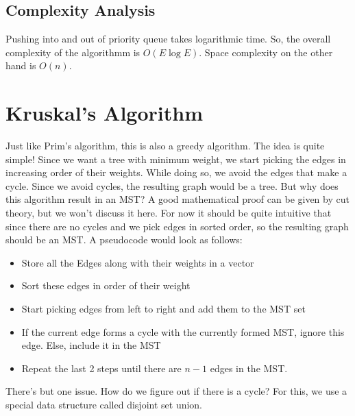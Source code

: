 \subsection{Complexity Analysis}
Pushing into and out of priority queue takes logarithmic time. So, the overall complexity of the algorithmm is $O(E \log E)$. Space complexity on the other hand is $O(n)$. 

\section{Kruskal's Algorithm}
Just like Prim's algorithm, this is also a greedy algorithm. The idea is quite simple! Since we want a tree with minimum weight, we start picking the edges in increasing order of their weights. While doing so, we avoid the edges that make a cycle. Since we avoid cycles, the resulting graph would be a tree. But why does this algorithm result in an MST? A good mathematical proof can be given by cut theory, but we won't discuss it here. For now it should be quite intuitive that since there are no cycles and we pick edges in sorted order, so the resulting graph should be an MST. A pseudocode would look as follows:
\begin{itemize}
   \item Store all the Edges along with their weights in a vector
   \item Sort these edges in order of their weight
   \item Start picking edges from left to right and add them to the MST set
   \item If the current edge forms a cycle with the currently formed MST, ignore this edge. Else, include it in the MST
   \item Repeat the last 2 steps until there are $n-1$ edges in the MST.
 \end{itemize}
 
There's but one issue. How do we figure out if there is a cycle? For this, we use a special data structure called disjoint set union. \clearpage


